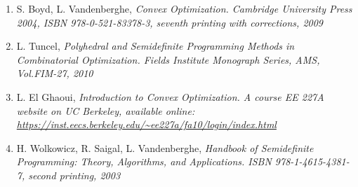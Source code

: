 \documentclass[12pt]{book}
\theoremstyle{definition}
\begin{document}
\begin{enumerate}
\renewcommand*\labelenumi{[\theenumi]}




%
\item S. Boyd, L. Vandenberghe, \it Convex Optimization. \rm Cambridge University Press 2004, ISBN 978-0-521-83378-3, seventh printing with corrections, 2009 
\label{BoydCvxOpt}
%
\item L. Tuncel, \it  Polyhedral and Semidefinite Programming Methods in Combinatorial Optimization. \rm  Fields Institute Monograph Series, AMS, Vol.FIM-27, 2010
\label{FieldsMono}
%
\item L. El Ghaoui, \it Introduction to Convex Optimization. \rm
A course EE 227A website on UC Berkeley, available online: 
\url{https://inst.eecs.berkeley.edu/~ee227a/fa10/login/index.html}
\label{IntroToCvxOptBerkley}



\item H. Wolkowicz, R. Saigal, L. Vandenberghe, \it Handbook of Semidefinite Programming: Theory, Algorithms, and Applications. \rm
ISBN 978-1-4615-4381-7, second printing, 2003
\label{HandbookSDP}
%




\end{enumerate}
\end{document}
